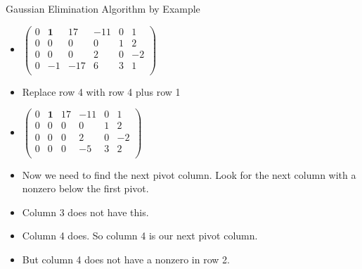 \documentclass{beamer}
\begin{document}
\begin{frame}{Gaussian Elimination Algorithm by Example}

\begin{itemize}
\item $
\begin{pmatrix}
0 & \textbf{1} &  17   & -11  &  0  &  1  \\
0 &         0  &  0    &  0   &  1  &  2 \\
0 &         0  &  0    &  2   &  0  &  -2 \\
0 &        -1  &  -17  &  6   &  3  &  1 \\
\end{pmatrix}
$
\item Replace row 4 with row 4 plus row 1
\item $
\begin{pmatrix}
0 & \textbf{1} &  17   &  -11   &  0  &  1  \\
0 &         0  &   0   &   0    &  1  &  2 \\
0 &         0  &   0   &   2   &  0  &  -2 \\
0 &         0  &   0   &  -5   &  3  &  2 \\
\end{pmatrix}
$
\item Now we need to find the next pivot column. Look for the
next column with a nonzero below the first pivot.
\item Column 3 does not have this.
\item Column 4 does. So column 4 is our next pivot column.
\item But column 4 does not have a nonzero in row 2.
\end{itemize}
\end{frame}

\end{document}
